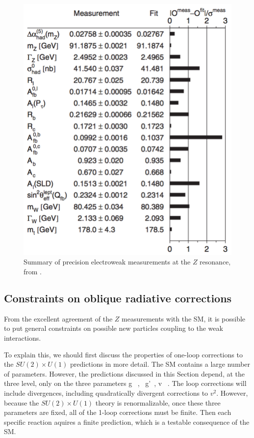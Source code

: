 \documentclass[12pt]{article}
\begin{document}
\begin{figure}
\begin{center}
\includegraphics[width=0.80\hsize]{Zsummary.pdf}
\end{center}
\caption{Summary of precision electroweak measurements at the $Z$
  resonance, from \cite{LEPEWWG}.}
\label{fig:Zsummary}
\end{figure}









\subsection{Constraints on oblique radiative corrections}


From the excellent agreement of the $Z$ measurements with the SM, it
is possible to put general constraints on possible new particles
coupling to the weak interactions.  

To explain this, we should first discuss the properties of one-loop
corrections to the $SU(2)\times U(1)$ predictions in more detail.
The SM contains a large number of parameters.  However,
the predictions discussed in this Section depend, at the three level,
only on the three parameters
\beq
      g \ , \ g'\ , v  \  .
\eeqn
The loop corrections will include divergences, including quadratically
divergent corrections to $v^2$.   However, because the $SU(2)\times
U(1)$ theory is renormalizable, once these three parameters are fixed,
all of the 1-loop corrections must be  finite.   Then each specific
reaction aquires a finite prediction, which is a testable consequence
of the SM.
\end{document}
